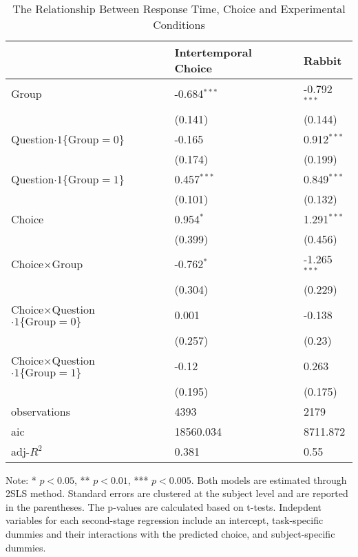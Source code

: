 \documentclass[12pt]{article}
\begin{document}
\begin{table}
    \caption{The Relationship Between Response Time, Choice and Experimental Conditions}
    \vspace*{12pt}
    \centering

      \begin{tabular}{lll}
\hline
 & Intertemporal Choice & Rabbit \\
\hline
Group & -0.684$^{***}$ & -0.792$^{***}$ \\
 & (0.141) & (0.144) \\
Question$\cdot1\{\text{Group}=0\}$ & -0.165 & 0.912$^{***}$ \\
 & (0.174) & (0.199) \\
Question$\cdot1\{\text{Group}=1\}$ & 0.457$^{***}$ & 0.849$^{***}$ \\
 & (0.101) & (0.132) \\
Choice & 0.954$^{*}$ & 1.291$^{***}$ \\
 & (0.399) & (0.456) \\
Choice$\times$Group & -0.762$^{*}$ & -1.265$^{***}$ \\
 & (0.304) & (0.229) \\
Choice$\times$Question$\cdot1\{\text{Group}=0\}$ & 0.001 & -0.138 \\
 & (0.257) & (0.23) \\
Choice$\times$Question$\cdot1\{\text{Group}=1\}$ & -0.12 & 0.263 \\
 & (0.195) & (0.175) \\\hline

observations & 4393 & 2179 \\
aic & 18560.034 & 8711.872 \\
adj-$R^2$ & 0.381 & 0.55 \\
\hline
\end{tabular}

    \vspace*{4pt}
    \centering
    \begin{minipage}{0.85\textwidth}
    {\par\footnotesize Note: * $p<0.05$, ** $p<0.01$, *** $p<0.005$. Both models are estimated through 2SLS method. Standard errors are clustered at the subject level and are reported in the parentheses. The p-values are calculated based on t-tests. Indepdent variables for each second-stage regression include an intercept, task-specific dummies and their interactions with the predicted choice, and subject-specific dummies.}
    \end{minipage}
    \label{tab:exp3_reg_response_time}
\end{table}
\end{document}
